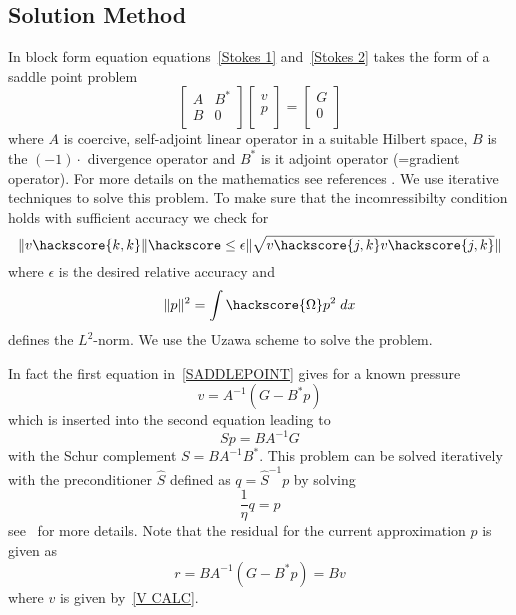 \subsection{Solution Method \label{STOKES SOLVE}}
In block form equation equations~\ref{Stokes 1} and~\ref{Stokes 2} takes the form of a saddle point problem
\begin{equation}
\left[ \begin{array}{cc}
A     & B^{*} \\
B & 0 \\
\end{array} \right]
\left[ \begin{array}{c}
v \\
p \\
\end{array} \right]
=\left[ \begin{array}{c}
G \\
0 \\
\end{array} \right]
\label{SADDLEPOINT}
\end{equation}
where $A$ is coercive, self-adjoint linear operator in a suitable Hilbert space, $B$ is the $(-1) \cdot$ divergence operator and $B^{*}$ is it adjoint operator (=gradient operator). For more details on the mathematics see references \cite{AAMIRBERKYAN2008,MBENZI2005}. 
We use iterative techniques to solve this problem. To make sure that the incomressibilty condition holds
with sufficient accuracy we check for 
\begin{equation}
\|v\hackscore{k,k}\| \hackscore \le  \epsilon
\|\sqrt{v\hackscore{j,k}v\hackscore{j,k}}\| 
\label{STOKES STOP}
\end{equation}
where $\epsilon$ is the desired relative accuracy and 
\begin{equation}
\|p\|^2= \int\hackscore{\Omega} p^2 \; dx
\label{PRESSURE NORM}
\end{equation}
defines the $L^2$-norm. We use the Uzawa scheme  to solve the problem.
 
In fact the first equation in~\ref{SADDLEPOINT} gives for a known pressure
\begin{equation}
v=A^{-1}(G-B^{*}p)
\label{V CALC}
\end{equation} 
which is inserted into the second equation leading to
\begin{equation}
S p =  B A^{-1} G
\end{equation}
with the Schur complement  $S=BA^{-1}B^{*}$. This problem can be solved iteratively
with the preconditioner $\hat{S}$ defined as $q=\hat{S}^{-1}p$ by solving
\begin{equation}
\frac{1}{\eta}q = p 
\end{equation}
see~\cite{ELMAN} for more details. Note that the residual for the current approximation $p$ is given as 
\begin{equation}
r=B A^{-1} (G - B^* p) = Bv 
\end{equation}
where $v$ is given by~\ref{V CALC}. 

